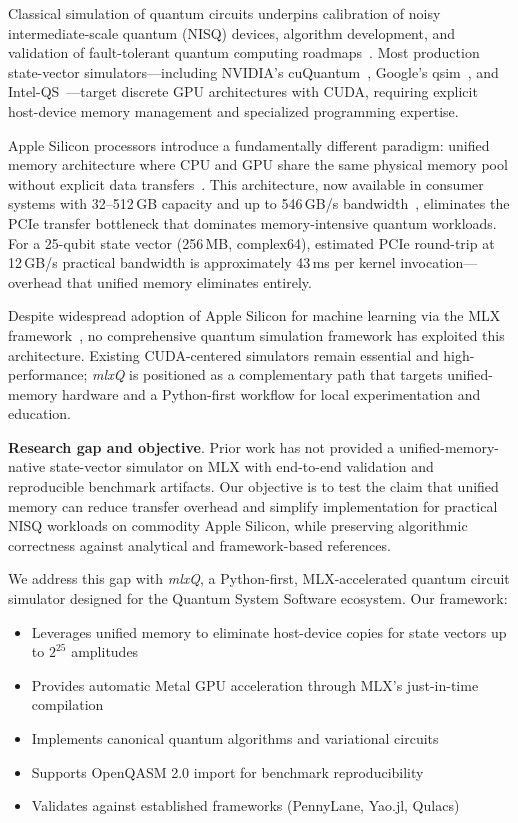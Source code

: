 \documentclass[runningheads]{llncs}
\newcommand{\mlxquantum}{\textit{mlxQ}\xspace}
\begin{document}
Classical simulation of quantum circuits underpins calibration of noisy intermediate-scale quantum (NISQ) devices, algorithm development, and validation of fault-tolerant quantum computing roadmaps~\cite{QuantumSimulation2025}. Most production state-vector simulators---including NVIDIA's cuQuantum~\cite{cuQuantum2023}, Google's qsim~\cite{Qsim}, and Intel-QS~\cite{IntelQS}---target discrete GPU architectures with CUDA, requiring explicit host-device memory management and specialized programming expertise.

Apple Silicon processors introduce a fundamentally different paradigm: unified memory architecture where CPU and GPU share the same physical memory pool without explicit data transfers~\cite{UnifiedMemory2024}. This architecture, now available in consumer systems with 32--512\,GB capacity and up to 546\,GB/s bandwidth~\cite{Apple2024M4}, eliminates the PCIe transfer bottleneck that dominates memory-intensive quantum workloads. For a 25-qubit state vector (256\,MB, complex64), estimated PCIe round-trip at 12\,GB/s practical bandwidth is approximately 43\,ms per kernel invocation---overhead that unified memory eliminates entirely.

Despite widespread adoption of Apple Silicon for machine learning via the MLX framework~\cite{MLXFramework2024}, no comprehensive quantum simulation framework has exploited this architecture. Existing CUDA-centered simulators remain essential and high-performance; \mlxquantum is positioned as a complementary path that targets unified-memory hardware and a Python-first workflow for local experimentation and education.

\textbf{Research gap and objective}. Prior work has not provided a unified-memory-native state-vector simulator on MLX with end-to-end validation and reproducible benchmark artifacts. Our objective is to test the claim that unified memory can reduce transfer overhead and simplify implementation for practical NISQ workloads on commodity Apple Silicon, while preserving algorithmic correctness against analytical and framework-based references.

We address this gap with \mlxquantum, a Python-first, MLX-accelerated quantum circuit simulator designed for the Quantum System Software ecosystem. Our framework:
\begin{itemize}
    \item Leverages unified memory to eliminate host-device copies for state vectors up to $2^{25}$ amplitudes
    \item Provides automatic Metal GPU acceleration through MLX's just-in-time compilation
    \item Implements canonical quantum algorithms and variational circuits
    \item Supports OpenQASM 2.0 import for benchmark reproducibility~\cite{OpenQASM2017}
    \item Validates against established frameworks (PennyLane, Yao.jl, Qulacs)~\cite{PennyLane2022,YaoJL2024,Qulacs}
\end{itemize}
\end{document}
